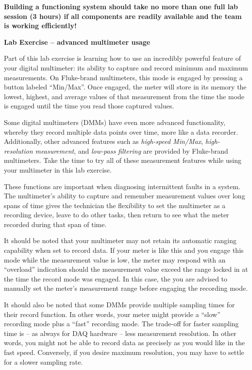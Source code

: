 \begin{itemize}
\vskip 10pt

{\bf Building a functioning system should take no more than one full lab session (3 hours) if all components are readily available and the team is working efficiently!}







\vfil \eject

\noindent
{\bf Lab Exercise -- advanced multimeter usage}

\vskip 5pt

Part of this lab exercise is learning how to use an incredibly powerful feature of your digital multimeter: its ability to capture and record minimum and maximum measurements.  On Fluke-brand multimeters, this mode is engaged by pressing a button labeled ``Min/Max''.  Once engaged, the meter will store in its memory the lowest, highest, and average values of that measurement from the time the mode is engaged until the time you read those captured values.

Some digital multimeters (DMMs) have even more advanced functionality, whereby they record multiple data points over time, more like a data recorder.  Additionally, other advanced features such as {\it high-speed Min/Max}, {\it high-resolution measurement}, and {\it low-pass filtering} are provided by Fluke-brand multimeters.  Take the time to try all of these measurement features while using your multimeter in this lab exercise.

\vskip 10pt

These functions are important when diagnosing intermittent faults in a system.  The multimeter's ability to capture and remember measurement values over long spans of time gives the technician the flexibility to set the multimeter as a recording device, leave to do other tasks, then return to see what the meter recorded during that span of time.

\vskip 10pt

It should be noted that your multimeter may not retain its automatic ranging capability when set to record data.  If your meter is like this and you engage this mode while the measurement value is low, the meter may respond with an ``overload'' indication should the measurement value exceed the range locked in at the time the record mode was engaged.  In this case, the you are advised to manually set the meter's measurement range before engaging the recording mode.

It should also be noted that some DMMs provide multiple sampling times for their record function.  In other words, your meter might provide a ``slow'' recording mode plus a ``fast'' recording mode.  The trade-off for faster sampling time is -- as always for DAQ hardware -- less measurement resolution.  In other words, you might not be able to record data as precisely as you would like in the fast speed.  Conversely, if you desire maximum resolution, you may have to settle for a slower sampling rate.


\end{itemize}
